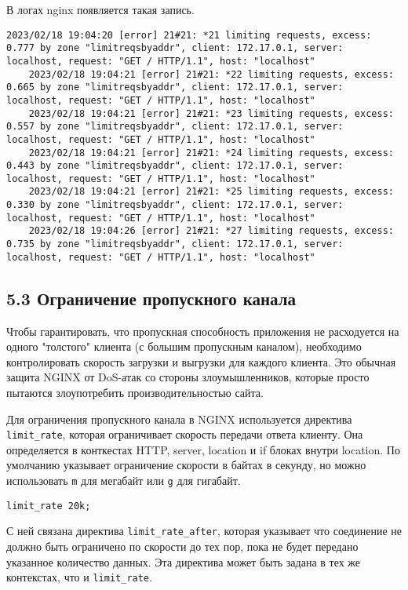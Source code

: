 В логах nginx появляется такая запись.

\begin{lstlisting}[style=CommandLineStyle]
    2023/02/18 19:04:20 [error] 21#21: *21 limiting requests, excess: 0.777 by zone "limitreqsbyaddr", client: 172.17.0.1, server: localhost, request: "GET / HTTP/1.1", host: "localhost"
    2023/02/18 19:04:21 [error] 21#21: *22 limiting requests, excess: 0.665 by zone "limitreqsbyaddr", client: 172.17.0.1, server: localhost, request: "GET / HTTP/1.1", host: "localhost"
    2023/02/18 19:04:21 [error] 21#21: *23 limiting requests, excess: 0.557 by zone "limitreqsbyaddr", client: 172.17.0.1, server: localhost, request: "GET / HTTP/1.1", host: "localhost"
    2023/02/18 19:04:21 [error] 21#21: *24 limiting requests, excess: 0.443 by zone "limitreqsbyaddr", client: 172.17.0.1, server: localhost, request: "GET / HTTP/1.1", host: "localhost"
    2023/02/18 19:04:21 [error] 21#21: *25 limiting requests, excess: 0.330 by zone "limitreqsbyaddr", client: 172.17.0.1, server: localhost, request: "GET / HTTP/1.1", host: "localhost"
    2023/02/18 19:04:26 [error] 21#21: *27 limiting requests, excess: 0.735 by zone "limitreqsbyaddr", client: 172.17.0.1, server: localhost, request: "GET / HTTP/1.1", host: "localhost"
\end{lstlisting}

\subsection*{5.3 Ограничение пропускного канала}

Чтобы гарантировать, что пропускная способность приложения не расходуется на одного "толстого" клиента (с большим пропускным каналом), необходимо контролировать скорость загрузки и выгрузки для каждого клиента. Это обычная защита NGINX от DoS-атак со стороны злоумышленников, которые просто пытаются злоупотребить производительностью сайта.

Для ограничения пропускного канала в NGINX используется директива \texttt{limit\_rate}, которая ограничивает скорость передачи ответа клиенту. Она определяется в конткестах HTTP, server, location и if блоках внутри location. По умолчанию указывает ограничение скорости в байтах в секунду, но можно использовать \texttt{m} для мегабайт или \texttt{g} для гигабайт.

\texttt{limit\_rate 20k;}

С ней связана директива \texttt{limit\_rate\_after}, которая указывает что соединение не должно быть ограничено по скорости до тех пор, пока не будет передано указанное количество данных. Эта директива может быть задана в тех же контекстах, что и \texttt{limit\_rate}.

